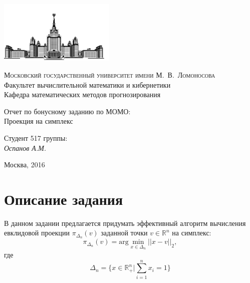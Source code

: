 \documentclass[12pt, a4paper]{article}
\begin{document}
    \setlength{\abovedisplayskip}{3pt}
    \setlength{\belowdisplayskip}{3pt}

    \thispagestyle{empty}

    \begin{singlespace}
    \begin{titlepage}
        \begin{center}
            \includegraphics[height = 3cm]{msu.png}

            {\scshape Московский государственный университет имени М.~В.~Ломоносова}\\
            Факультет вычислительной математики и кибернетики\\
            Кафедра математических методов прогнозирования\\
            \centerline{\hfill\hrulefill\hrulefill\hrulefill\hrulefill\hfill}

            \vfill

            {\LARGE Отчет по бонусному заданию по МОМО: \\ Проекция на симплекс}

            \vspace{1cm}

        \end{center}

        \vfill

        \begin{flushright}
            Студент 517 группы:\\
                \textit{Оспанов А.М.}

            \vspace{5mm}

        \end{flushright}

        \vfill

        \begin{center}
            Москва, 2016
        \end{center}
    \end{titlepage}
    \end{singlespace}

    \newpage


    \section{Описание задания}
    В данном задании предлагается придумать эффективный алгоритм вычисления евклидовой проекции $\pi_{\Delta_n}(v)$
    заданной точки $v \in \mathbb{R}^n$ на симплекс:
    $$\pi_{\Delta_n}(v) = \text{arg}\min\limits_{x \in \Delta_n}||x - v||_2,$$
    где
    $$\Delta_n = \Big\{ x \in \mathbb{R}_+^n | \displaystyle\sum_{i=1}^n x_i = 1 \Big\}$$
\end{document}
